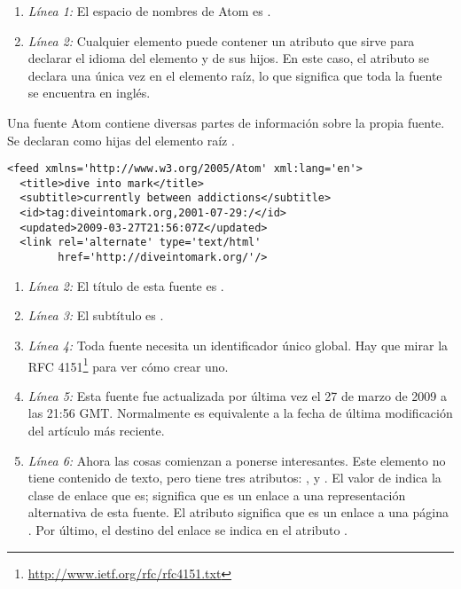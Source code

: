 \begin{enumerate}

\item \emph{Línea 1:} El espacio de nombres de Atom es .

\item \emph{Línea 2:} Cualquier elemento puede contener un atributo  que sirve para declarar el idioma del elemento y de sus hijos. En este caso, el atributo  se declara una única vez en el elemento raíz, lo que significa que toda la fuente se encuentra en inglés.

\end{enumerate}

Una fuente Atom contiene diversas partes de información sobre la propia fuente. Se declaran como hijas del elemento raíz .

\noindent\begin{minipage}{\textwidth}
\begin{lstlisting}[mathescape=True]
<feed xmlns='http://www.w3.org/2005/Atom' xml:lang='en'>
  <title>dive into mark</title>
  <subtitle>currently between addictions</subtitle>
  <id>tag:diveintomark.org,2001-07-29:/</id>
  <updated>2009-03-27T21:56:07Z</updated>
  <link rel='alternate' type='text/html'
        href='http://diveintomark.org/'/>
\end{lstlisting}
\end{minipage}

\begin{enumerate}

\item \emph{Línea 2:} El título de esta fuente es .

\item \emph{Línea 3:} El subtítulo es .

\item \emph{Línea 4:} Toda fuente necesita un identificador único global. Hay que mirar la RFC 4151\footnote{\href{http://www.ietf.org/rfc/rfc4151.txt}{http://www.ietf.org/rfc/rfc4151.txt}} para ver cómo crear uno.

\item \emph{Línea 5:} Esta fuente fue actualizada por última vez el 27 de marzo de 2009 a las 21:56 GMT. Normalmente es equivalente a la fecha de última modificación del artículo más reciente.

\item \emph{Línea 6:} Ahora las cosas comienzan a ponerse interesantes. Este elemento  no tiene contenido de texto, pero tiene tres atributos: ,  y . El valor de  indica la clase de enlace que es;  significa que es un enlace a una representación alternativa de esta fuente. El atributo  significa que es un enlace a una página . Por último, el destino del enlace se indica en el atributo .

\end{enumerate}


